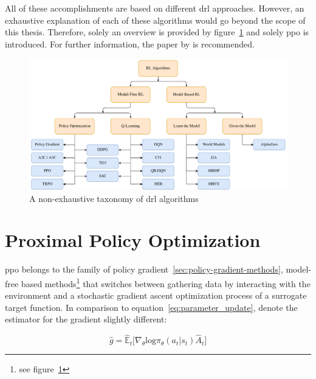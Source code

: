 \documentclass[draft,final]{vutinfth} %
\begin{document}
    All of these accomplishments are based on different \gls{drl} approaches.
    However, an exhaustive explanation of each of these algorithms would go beyond the scope of this thesis.
    Therefore, solely an overview is provided by figure~\ref{fig:drl_taxonomy} and solely \gls{ppo} is introduced.
    For further information, the paper by \citeauthor{francois-lavet_introduction_2018} is recommended.

    \begin{figure}[h]
        \centering
        \includegraphics[width=\textwidth]{figures/drl_taxonomy.png}
        \caption[A non-exhaustive taxonomy of \gls{drl} algorithms]{A non-exhaustive taxonomy of \gls{drl} algorithms\protect\footnotemark}
        \label{fig:drl_taxonomy}
    \end{figure}



    \section{Proximal Policy Optimization}\label{sec:proximal-policy-optimization}
    \gls{ppo} belongs to the family of policy gradient~\eqref{sec:policy-gradient-methods}, model-free based methods\footnote{see figure~\ref{fig:drl_taxonomy}} that switches between gathering data by interacting with the environment and a stochastic gradient ascent optimization process of a surrogate target function.
    In comparison to equation~\ref{eq:parameter_update}, \citeauthor{schulman_proximal_2017} denote the estimator for the gradient slightly different:

    \begin{equation}
        \hat{g}=\hat{\mathbb{E}}_t \bigg [\nabla_\theta \text{log}\pi_\theta(a_t|s_t)\hat{A}_t\bigg]\label{eq:policy_gradient_method_maximization}
    \end{equation}
\end{document}
